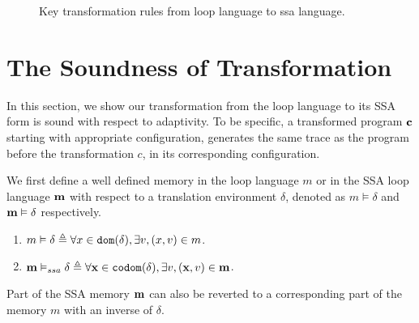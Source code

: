 {\begin{figure}
    \vspace{-0.4cm}
 \caption{Key transformation rules from loop language to ssa language.}
    \label{fig:trans_rules}
    \vspace{-0.4cm}
\end{figure}
}
\section{The Soundness of Transformation}
\label{sec:adapt-transformation-soundness}
In this section, we show our transformation from the {loop} language to its SSA form is sound with respect to adaptivity. To be specific, a transformed program ${\bf{{c}}}$ starting with appropriate configuration, generates the same trace as the program before the transformation $c$, in its corresponding configuration.

We first define a well defined memory in the {loop} language $m$ or in the SSA loop language ${\bf{{m}}}$ with respect to a translation environment $\delta$, denoted as $m \vDash \delta$ and ${\bf{{m}}} \vDash \delta$ respectively. 

\begin{defn} 
\begin{enumerate}
    \item $ m \vDash \delta  \triangleq \forall x \in \mathtt{dom}(\delta), \exists v, (x,v) \in m$.
    \item $ {\bf{{m}}} \vDash_{ssa} \delta  \triangleq \forall {\bf{{x}}} \in \mathtt{codom}(\delta), \exists v, ({\bf{{x}}},v) \in {\bf{{m}}}$.
\end{enumerate}
\end{defn}
   Part of the SSA memory ${\bf{{m}}}$ can also be reverted to a corresponding part of the memory $m$ with an inverse of $\delta$.

